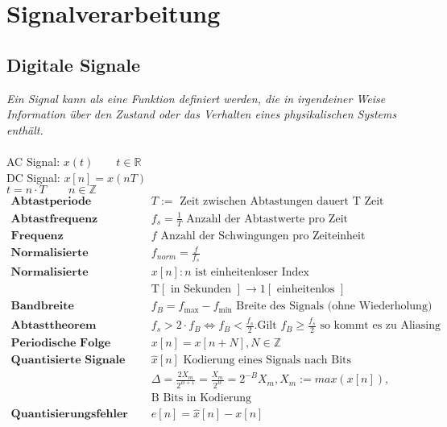 \documentclass[8pt]{article}
\begin{document}
	\section{Signalverarbeitung}
		\subsection{Digitale Signale}
		\textit{Ein Signal kann als eine Funktion definiert werden,
die in irgendeiner Weise Information \"uber den Zustand
oder das Verhalten eines physikalischen Systems enth\"alt.}\\\\
		AC Signal: $x(t) \qquad t \in \mathbb{R}$\\
		DC Signal: $x[n] = x(nT)$\\
		$t = n \cdot T \qquad n \in \mathbb{Z}$\\
		\begin{align*}
			\textbf{Abtastperiode } & T := \text{ Zeit zwischen Abtastungen dauert T Zeit}\\
			\textbf{Abtastfrequenz } & f_s = \frac{1}{T} \text{ Anzahl der Abtastwerte pro Zeit}\\
			\textbf{Frequenz } & f \text{ Anzahl der Schwingungen pro Zeiteinheit}\\
			\textbf{Normalisierte Frequenz } & f_{norm} = \frac{f}{f_s}\\
			\textbf{Normalisierte Darstellung } & x[n]: n \text{ ist einheitenloser Index}\\
			& \text{T} [\text{ in Sekunden }] \rightarrow 1 [\text{ einheitenlos }]\\
			\textbf{Bandbreite } & f_B = f_\text{max} - f_\text{min}  \text{ Breite des Signals (ohne Wiederholung)}\\
			\textbf{Abtasttheorem } & f_s > 2 \cdot f_B \Leftrightarrow f_B < \frac{f_s}{2}. \text{Gilt } f_B \geq \frac{f_s}{2} \text{ so kommt es zu Aliasing}\\
			\textbf{Periodische Folge } & x[n] = x[n + N], N \in \mathbb{Z}\\
			\textbf{Quantisierte Signale } & \hat{x}[n] \text{ Kodierung eines Signals nach Bits}\\
			& \Delta = \frac{2X_m}{2^{B+1}} = \frac{X_m}{2^B} = 2^{-B}X_m, X_m:= max(x[n]),\\
			& \text{B Bits in Kodierung}\\
			\textbf{Quantisierungsfehler } & e[n] = \hat{x}[n] - x[n]\\
		\end{align*}
\end{document}
